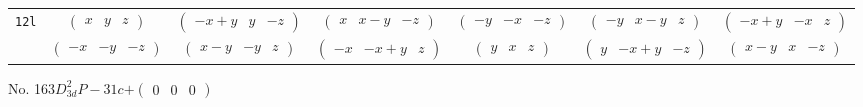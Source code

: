 \documentclass[fleqn,9pt,landscape]{jsarticle}
\begin{document}
\begin{center}
\begin{longtable}{ccccccc}
{\tt 12l} & $ \begin{pmatrix} x & y & z \end{pmatrix} $ & $ \begin{pmatrix} - x + y & y & - z \end{pmatrix} $ & $ \begin{pmatrix} x & x - y & - z \end{pmatrix} $ & $ \begin{pmatrix} - y & - x & - z \end{pmatrix} $ & $ \begin{pmatrix} - y & x - y & z \end{pmatrix} $ & $ \begin{pmatrix} - x + y & - x & z \end{pmatrix} $ \\
& $ \begin{pmatrix} - x & - y & - z \end{pmatrix} $ & $ \begin{pmatrix} x - y & - y & z \end{pmatrix} $ & $ \begin{pmatrix} - x & - x + y & z \end{pmatrix} $ & $ \begin{pmatrix} y & x & z \end{pmatrix} $ & $ \begin{pmatrix} y & - x + y & - z \end{pmatrix} $ & $ \begin{pmatrix} x - y & x & - z \end{pmatrix} $ \\
\end{longtable}
\end{center}
\newpage
No. 163\quad$D_{3d}^{2}$\quad$P-31c$\quad[ trigonal ]\quad$+\begin{pmatrix} 0 & 0 & 0 \end{pmatrix}$
\end{document}
